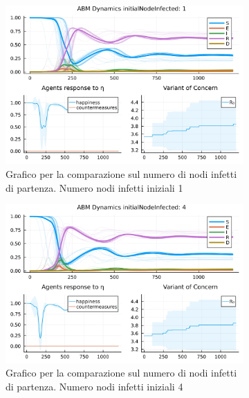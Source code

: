 \begin{figure}[!hb]
	\centering
	\begin{subfigure}[b]{0.45\textwidth}
		\centering
		\includegraphics[width=\textwidth]{img/SocialNetworkABM_1_II.jpg}
		\caption{Grafico per la comparazione sul numero di nodi infetti di partenza. Numero nodi infetti iniziali 1}
		\label{fig:comparison_init_node_inf_1}
	\end{subfigure}
	\hfill
	\begin{subfigure}[b]{0.45\textwidth}
		\centering
		\includegraphics[width=\textwidth]{img/SocialNetworkABM_2_II.jpg}
		\caption{Grafico per la comparazione sul numero di nodi infetti di partenza. Numero nodi infetti iniziali 4}
		\label{fig:comparison_init_node_inf_4}
	\end{subfigure}
	\hfill
	\begin{subfigure}[b]{0.45\textwidth}
		\centering

\end{subfigure}
\end{figure}
